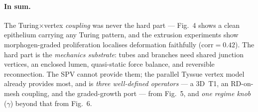 \documentclass[11pt]{article}
\begin{document}
\paragraph{In sum.} The Turing$\times$vertex \emph{coupling} was never the hard part --- Fig.~4 shows a
clean epithelium carrying any Turing pattern, and the extrusion experiments show morphogen-graded
proliferation localises deformation faithfully ($\mathrm{corr}\!=\!0.42$). The hard part is the
\emph{mechanics substrate}: tubes and branches need shared junction vertices, an enclosed lumen,
quasi-static force balance, and reversible reconnection. The SPV cannot provide them; the parallel Tyssue
vertex model already provides most, and is \emph{three well-defined operators} --- a 3D~T1, an RD-on-mesh
coupling, and the graded-growth port --- from Fig.~5, and \emph{one regime knob} ($\gamma$) beyond that
from Fig.~6.
\end{document}
